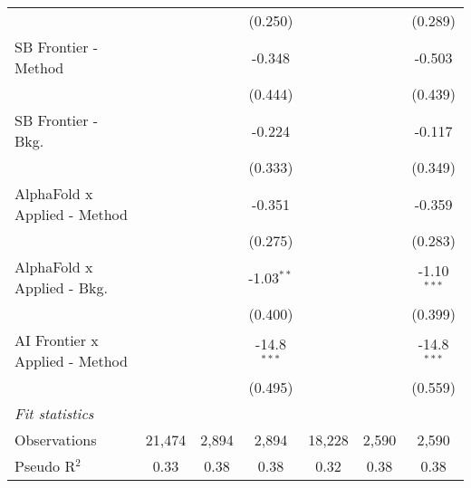 \begin{tabular}{lcccccc}
                                  &               &                & (0.250)       &              &                & (0.289)\\   
   SB Frontier - Method           &               &                & -0.348        &              &                & -0.503\\   
                                  &               &                & (0.444)       &              &                & (0.439)\\   
   SB Frontier - Bkg.             &               &                & -0.224        &              &                & -0.117\\   
                                  &               &                & (0.333)       &              &                & (0.349)\\   
   AlphaFold x Applied - Method   &               &                & -0.351        &              &                & -0.359\\   
                                  &               &                & (0.275)       &              &                & (0.283)\\   
   AlphaFold x Applied - Bkg.     &               &                & -1.03$^{**}$  &              &                & -1.10$^{***}$\\   
                                  &               &                & (0.400)       &              &                & (0.399)\\   
   AI Frontier x Applied - Method &               &                & -14.8$^{***}$ &              &                & -14.8$^{***}$\\   
                                  &               &                & (0.495)       &              &                & (0.559)\\   
   \midrule
   \emph{Fit statistics}\\
   Observations                   & 21,474        & 2,894          & 2,894         & 18,228       & 2,590          & 2,590\\  
   Pseudo R$^2$                   & 0.33          & 0.38           & 0.38          & 0.32         & 0.38           & 0.38\\  
   

\end{tabular}
